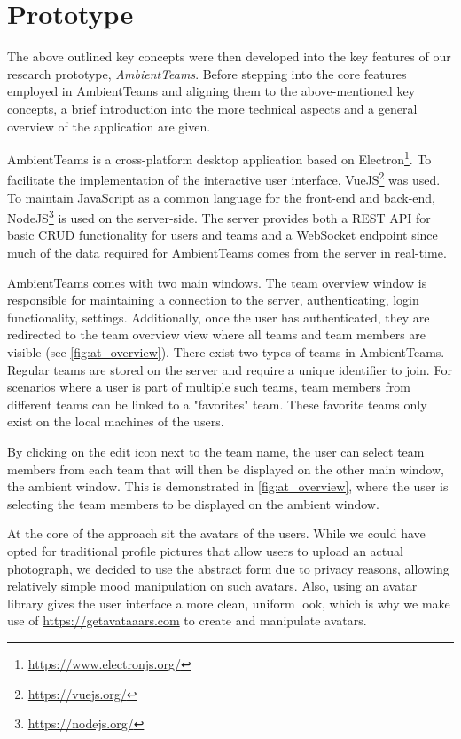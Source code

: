 \chapter{Prototype}
\label{chapter:prototype}
The above outlined key concepts were then developed into the key features of our research prototype, \textit{AmbientTeams}. Before stepping into the core features employed in AmbientTeams and aligning them to the above-mentioned key concepts, a brief introduction into the more technical aspects and a general overview of the application are given.

AmbientTeams is a cross-platform desktop application based on Electron\footnote{\url{https://www.electronjs.org/}}. To facilitate the implementation of the interactive user interface, VueJS\footnote{\url{https://vuejs.org/}} was used. To maintain JavaScript as a common language for the front-end and back-end, NodeJS\footnote{\url{https://nodejs.org/}} is used on the server-side. The server provides both a REST API for basic CRUD functionality for users and teams and a WebSocket endpoint since much of the data required for AmbientTeams comes from the server in real-time.

AmbientTeams comes with two main windows. The team overview window is responsible for maintaining a connection to the server, authenticating, login functionality, settings. Additionally, once the user has authenticated, they are redirected to the team overview view where all teams and team members are visible (see \autoref{fig:at_overview}). There exist two types of teams in AmbientTeams. Regular teams are stored on the server and require a unique identifier to join. For scenarios where a user is part of multiple such teams, team members from different teams can be linked to a "favorites" team. These favorite teams only exist on the local machines of the users.

By clicking on the edit icon next to the team name, the user can select team members from each team that will then be displayed on the other main window, the ambient window. This is demonstrated in \autoref{fig:at_overview}, where the user is selecting the team members to be displayed on the ambient window.

At the core of the approach sit the avatars of the users. While we could have opted for traditional profile pictures that allow users to upload an actual photograph, we decided to use the abstract form due to privacy reasons, allowing relatively simple mood manipulation on such avatars. Also, using an avatar library gives the user interface a more clean, uniform look, which is why
we make use of \url{https://getavataaars.com} to create and manipulate avatars.



